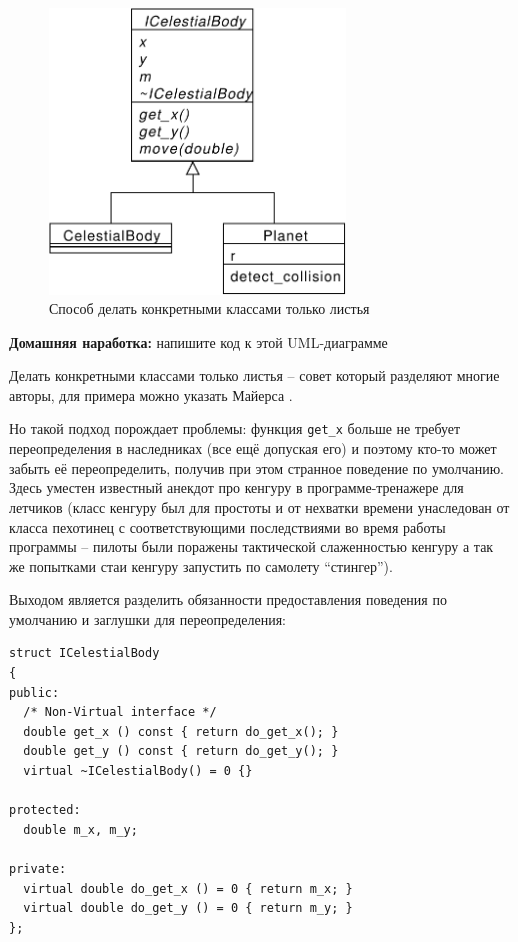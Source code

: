 \documentclass[a4paper,12pt,oneside]{article}
\begin{document}
\begin{figure}[h!]
\centering
\includegraphics[width=0.7\textwidth]{illustrations/better-implinh-crop.pdf}
\caption{Способ делать конкретными классами только листья}
\label{fig:better-implinhh}
\end{figure}

\textbf{Домашняя наработка:} напишите код к этой UML-диаграмме

Делать конкретными классами только листья -- совет который разделяют многие авторы, для примера можно указать Майерса \cite{effcpp3d}.

Но такой подход порождает проблемы: функция \lstinline!get_x! больше не требует переопределения в наследниках (все ещё допуская его) и поэтому кто-то может забыть её переопределить, получив при этом странное поведение по умолчанию. Здесь уместен известный анекдот про кенгуру в программе-тренажере для летчиков (класс кенгуру был для простоты и от нехватки времени унаследован от класса пехотинец с соответствующими последствиями во время работы программы -- пилоты были поражены тактической слаженностью кенгуру а так же попытками стаи кенгуру запустить по самолету ``стингер'').

Выходом является разделить обязанности предоставления поведения по умолчанию и заглушки для переопределения:

\begin{lstlisting}
struct ICelestialBody
{
public:
  /* Non-Virtual interface */
  double get_x () const { return do_get_x(); }
  double get_y () const { return do_get_y(); }
  virtual ~ICelestialBody() = 0 {}

protected:
  double m_x, m_y;

private:
  virtual double do_get_x () = 0 { return m_x; }
  virtual double do_get_y () = 0 { return m_y; }
};
\end{lstlisting}
\end{document}
